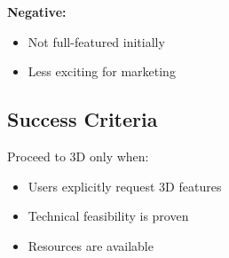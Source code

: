 \textbf{Negative:}
\begin{itemize}
    \item Not full-featured initially
    \item Less exciting for marketing
\end{itemize}

\subsection{Success Criteria}
Proceed to 3D only when:
\begin{itemize}
    \item Users explicitly request 3D features
    \item Technical feasibility is proven
    \item Resources are available
\end{itemize}
